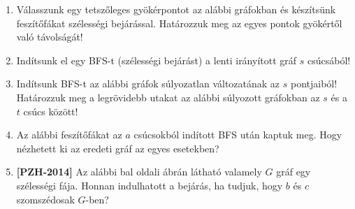\documentclass[a4paper,12pt]{article}
\begin{document}
        \noindent{}
        \begin{enumerate}
            \item Válasszunk egy tetszőleges gyökérpontot az alábbi gráfokban és készítsünk feszítőfákat szélességi bejárással. Határozzuk meg az egyes pontok gyökértől való távolságát!
            \begin{figure}[h]
                \centering
                 \hspace{1in}
                
            \end{figure}

            \item Indítsunk el egy BFS-t (szélességi bejárást) a lenti irányított gráf $s$ csúcsából!
            \begin{figure}[h]
                \centering
                
            \end{figure}
            \item Indítsunk BFS-t az alábbi gráfok súlyozatlan változatának az $s$ pontjaiból! Határozzuk meg a legrövidebb utakat az alábbi súlyozott gráfokban az $s$ és a $t$ csúcs között!
        \begin{figure}[!h]
            \centering \hfill
            \hfill
            \hfill \hfill
        \end{figure}
        \item Az alábbi feszítőfákat az $a$ csúcsokból indított BFS után kaptuk meg. Hogy nézhetett ki az eredeti gráf az egyes esetekben? 
        \begin{figure}[!h]
            \centering
            \begin{subfigure}{0.2\textwidth}
                \centering
                
            \end{subfigure}
            \begin{subfigure}{0.2\textwidth}
                \centering		
                
            \end{subfigure}
            \begin{subfigure}{0.2\textwidth}
                \centering
                
            \end{subfigure}
            \begin{subfigure}{0.2\textwidth}
                \centering
                
            \end{subfigure}
        \end{figure}
        \item \textbf{[PZH-2014]} Az alábbi bal oldali ábrán látható valamely $G$ gráf egy szélességi fája. Honnan indulhatott a bejárás, ha tudjuk, hogy $b$ és $c$ szomszédosak $G$-ben?
        

\end{enumerate}
\end{document}
